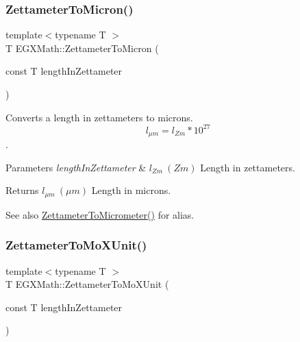 \subsubsection{\texorpdfstring{Zettameter\+To\+Micron()}{ZettameterToMicron()}}
{\footnotesize\ttfamily template$<$typename T $>$ \\
T E\+G\+X\+Math\+::\+Zettameter\+To\+Micron (\begin{DoxyParamCaption}\item[{const T}]{length\+In\+Zettameter }\end{DoxyParamCaption})}



Converts a length in zettameters to microns. \[ l_{\mu m}=l_{Zm} * 10^{27} \]. 


\begin{DoxyParams}{Parameters}
{\em length\+In\+Zettameter} & $ l_{Zm}\ (Zm)$ Length in zettameters. \\
\hline
\end{DoxyParams}
\begin{DoxyReturn}{Returns}
$ l_{\mu m}\ (\mu m)$ Length in microns. 
\end{DoxyReturn}
\begin{DoxySeeAlso}{See also}
\mbox{\hyperlink{group___e_g_x_math-_conversions-_length_conversions-_zettameter-_s_i_ga495f68a50945d994b3f2d455b3348595}{Zettameter\+To\+Micrometer()}} for alias. 
\end{DoxySeeAlso}
\mbox{\label{group___e_g_x_math-_conversions-_length_conversions-_zettameter-_non-_s_i_ga10039261b7de3417e69110a56312b9ef}} 
\subsubsection{\texorpdfstring{Zettameter\+To\+Mo\+X\+Unit()}{ZettameterToMoXUnit()}}
{\footnotesize\ttfamily template$<$typename T $>$ \\
T E\+G\+X\+Math\+::\+Zettameter\+To\+Mo\+X\+Unit (\begin{DoxyParamCaption}\item[{const T}]{length\+In\+Zettameter }\end{DoxyParamCaption})}



